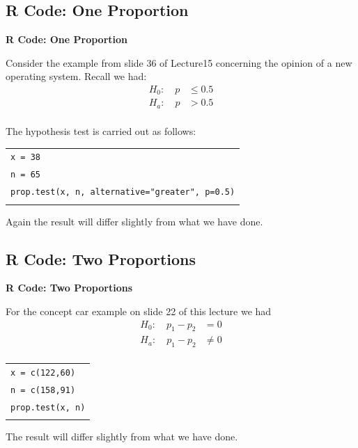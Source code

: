\documentclass[compress]{beamer}        %
\makeatletter
\newcommand{\tcb}{\textcolor{beamer@blendedblue}}
\makeatother
\begin{document}
\subsection{R Code: One Proportion}
\begin{frame}{\bf \tcb{R Code: One Proportion}}

Consider the example from slide 36 of Lecture15 concerning the opinion of a new operating system. Recall we had:
\begin{align*}
H_0: \quad p &\le 0.5\\[0.2cm]
H_a: \quad p &> 0.5\\[-0.5cm]
\end{align*}

The hypothesis test is carried out as follows:\\[0.3cm]
\begin{tabular}{|l|}
\hline
\texttt{x = 38}\\
\texttt{n = 65}\\[0.2cm]
\texttt{prop.test(x, n, alternative="greater", p=0.5)}\\
\hline
\multicolumn{1}{c}{}\\[0.2cm]
\end{tabular}

Again the result will differ slightly from what we have done.

\end{frame}





\subsection{R Code: Two Proportions}
\begin{frame}{\bf \tcb{R Code: Two Proportions}}

For the concept car example on slide 22 of this lecture we had
\begin{align*}
H_0:\quad p_1 - p_2 &= 0\\[0.2cm]
H_a:\quad p_1 - p_2 &\ne 0\\[-0.3cm]
\end{align*}

\begin{tabular}{|l|}
\hline
\texttt{x = c(122,60)}\\
\texttt{n = c(158,91)}\\[0.2cm]
\texttt{prop.test(x, n)}\\
\hline
\multicolumn{1}{c}{}\\[0.2cm]
\end{tabular}


The result will differ slightly from what we have done.



\end{frame}
\end{document}
